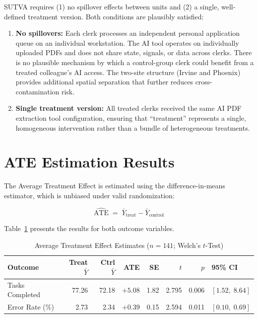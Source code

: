 \documentclass[12pt]{article}
\begin{document}
SUTVA requires (1) no spillover effects between units and (2) a single, well-defined
treatment version. Both conditions are plausibly satisfied:

\begin{enumerate}
    \item \textbf{No spillovers:} Each clerk processes an independent personal
    application queue on an individual workstation. The AI tool operates on
    individually uploaded PDFs and does not share state, signals, or data across
    clerks. There is no plausible mechanism by which a control-group clerk could
    benefit from a treated colleague's AI access. The two-site structure (Irvine
    and Phoenix) provides additional spatial separation that further reduces
    cross-contamination risk.

    \item \textbf{Single treatment version:} All treated clerks received the same
    AI PDF extraction tool configuration, ensuring that ``treatment'' represents
    a single, homogeneous intervention rather than a bundle of heterogeneous treatments.
\end{enumerate}

\section{ATE Estimation Results}

The Average Treatment Effect is estimated using the difference-in-means estimator,
which is unbiased under valid randomization:

\[
\widehat{\text{ATE}} \;=\; \bar{Y}_{\text{treat}} - \bar{Y}_{\text{control}}
\]

Table~\ref{tab:ate} presents the results for both outcome variables.

\begin{table}[H]
\centering
\caption{Average Treatment Effect Estimates ($n = 141$; Welch's $t$-Test)}
\label{tab:ate}
\begin{tabular}{lrrrrrrl}
\toprule
\textbf{Outcome} & \textbf{Treat $\bar{Y}$} & \textbf{Ctrl $\bar{Y}$}
    & \textbf{ATE} & \textbf{SE} & \textbf{$t$}
    & \textbf{$p$} & \textbf{95\% CI} \\
\midrule
Tasks Completed & 77.26 & 72.18 & $+5.08$ & 1.82 & 2.795 & 0.006 & $[1.52,\;8.64]$ \\
Error Rate (\%) & 2.73  & 2.34  & $+0.39$ & 0.15 & 2.594 & 0.011 & $[0.10,\;0.69]$ \\
\bottomrule
\end{tabular}
\end{table}
\end{document}
